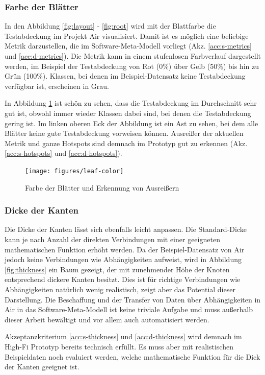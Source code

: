 \subsubsection*{Farbe der Blätter}

In den Abbildung \ref{fig:layout} - \ref{fig:root} wird mit der Blattfarbe die Testabdeckung im Projekt Air visualisiert. Damit ist es möglich eine beliebige Metrik darzustellen, die im Software-Meta-Modell vorliegt (Akz. \ref{acc:s-metrics} und \ref{acc:d-metrics}). Die Metrik kann in einem stufenlosen Farbverlauf dargestellt werden, im Beispiel der Testabdeckung von Rot (0\%) über Gelb (50\%) bis hin zu Grün (100\%). Klassen, bei denen im Beispiel-Datensatz keine Testabdeckung verfügbar ist, erscheinen in Grau.

In Abbildung \ref{fig:leaf-color} ist schön zu sehen, dass die Testabdeckung im Durchschnitt sehr gut ist, obwohl immer wieder Klassen dabei sind, bei denen die Testabdeckung gering ist. Im linken oberen Eck der Abbildung ist ein Ast zu sehen, bei dem alle Blätter keine gute Testabdeckung vorweisen können. Ausreißer der aktuellen Metrik und ganze Hotspots sind demnach im Prototyp gut zu erkennen (Akz. \ref{acc:s-hotspots} und \ref{acc:d-hotspots}).

\begin{figure}[htb]
  \texttt{[image: figures/leaf-color]}
  \caption{Farbe der Blätter und Erkennung von Ausreißern}
  \label{fig:leaf-color}
\end{figure}

\subsubsection*{Dicke der Kanten}

Die Dicke der Kanten lässt sich ebenfalls leicht anpassen. Die Standard-Dicke kann je nach Anzahl der direkten Verbindungen mit einer geeigneten mathematischen Funktion erhöht werden. Da der Beispiel-Datensatz von Air jedoch keine Verbindungen wie Abhängigkeiten aufweist, wird in Abbildung \ref{fig:thickness} ein Baum gezeigt, der mit zunehmender Höhe der Knoten entsprechend dickere Kanten besitzt. Dies ist für richtige Verbindungen wie Abhängigkeiten natürlich wenig realistisch, zeigt aber das Potential dieser Darstellung. Die Beschaffung und der Transfer von Daten über Abhängigkeiten in Air in das Software-Meta-Modell ist keine triviale Aufgabe und muss außerhalb dieser Arbeit bewältigt und vor allem auch automatisiert werden.

Akzeptanzkriterium \ref{acc:s-thickness} und \ref{acc:d-thickness} wird demnach im High-Fi Prototyp bereits technisch erfüllt. Es muss aber mit realistischen Beispieldaten noch evaluiert werden, welche mathematische Funktion für die Dick der Kanten geeignet ist.

